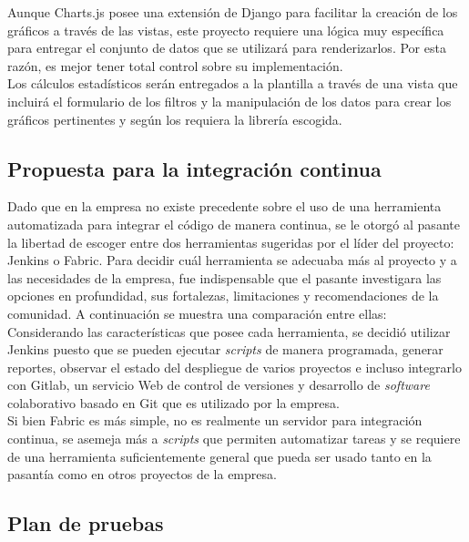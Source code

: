 Aunque Charts.js posee una extensión de Django para facilitar la creación de los gráficos a través de las vistas, este proyecto requiere una lógica muy específica para entregar el conjunto de datos que se utilizará para renderizarlos. Por esta razón, es mejor tener total control sobre su implementación. \\

Los cálculos estadísticos serán entregados a la plantilla a través de una vista que incluirá el formulario de los filtros y la manipulación de los datos para crear los gráficos pertinentes y según los requiera la librería escogida.

\subsection{Propuesta para la integración continua}

Dado que en la empresa no existe precedente sobre el uso de una herramienta
automatizada para integrar el código de manera continua, se le otorgó al
pasante la libertad de escoger entre dos herramientas sugeridas por el líder
del proyecto: Jenkins o Fabric. Para decidir cuál herramienta se adecuaba más
al proyecto y a las necesidades de la empresa, fue indispensable que el pasante
investigara las opciones en profundidad, sus fortalezas, limitaciones y
recomendaciones de la comunidad. A continuación se muestra una comparación
entre ellas: \\


Considerando las características que posee cada herramienta, se decidió
utilizar Jenkins puesto que se pueden ejecutar \textit{scripts} de manera
programada, generar reportes, observar el estado del despliegue de varios
proyectos e incluso integrarlo con Gitlab, un servicio Web de control de
versiones y desarrollo de \textit{software} colaborativo basado en Git que es
utilizado por la empresa. \\

Si bien Fabric es más simple, no es realmente un servidor para integración
continua, se asemeja más a \textit{scripts} que permiten automatizar tareas y
se requiere de una herramienta suficientemente general que pueda ser usado
tanto en la pasantía como en otros proyectos de la empresa.

\subsection{Plan de pruebas}

